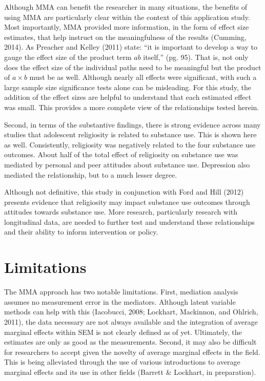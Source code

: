 \documentclass[]{DissertateUSU}
\begin{document}
Although MMA can benefit the researcher in many situations, the benefits
of using MMA are particularly clear within the context of this
application study. Most importantly, MMA provided more information, in
the form of effect size estimates, that help instruct on the
meaningfulness of the results (Cumming, 2014). As Preacher and Kelley
(2011) state: ``it is important to develop a way to gauge the effect
size of the product term \(ab\) itself,'' (pg. 95). That is, not only
does the effect size of the individual paths need to be meaningful but
the product of \(a \times b\) must be as well. Although nearly all
effects were significant, with such a large sample size significance
tests alone can be misleading. For this study, the addition of the
effect sizes are helpful to understand that each estimated effect was
small. This provides a more complete view of the relationships tested
herein.

Second, in terms of the substantive findings, there is strong evidence
across many studies that adolescent religiosity is related to substance
use. This is shown here as well. Consistently, religiosity was
negatively related to the four substance use outcomes. About half of the
total effect of religiosity on substance use was mediated by personal
and peer attitudes about substance use. Depression also mediated the
relationship, but to a much lesser degree.

Although not definitive, this study in conjunction with Ford and Hill
(2012) presents evidence that religiosity may impact substance use
outcomes through attitudes towards substance use. More research,
particularly research with longitudinal data, are needed to further test
and understand these relationships and their ability to inform
intervention or policy.

\section{Limitations}\label{limitations}

The MMA approach has two notable limitations. First, mediation analysis
assumes no measurement error in the mediators. Although latent variable
methods can help with this (Iacobucci, 2008; Lockhart, Mackinnon, and
Ohlrich, 2011), the data necessary are not always available and the
integration of average marginal effects within SEM is not clearly
defined as of yet. Ultimately, the estimates are only as good as the
measurements. Second, it may also be difficult for researchers to accept
given the novelty of average marginal effects in the field. This is
being alleviated through the use of various introductions to average
marginal effects and its use in other fields (Barrett \& Lockhart, in
preparation).
\end{document}
